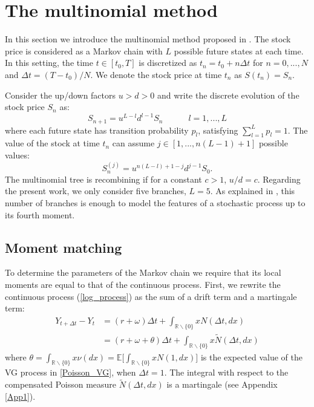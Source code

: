 \documentclass[]{interact}
\newcommand{\numberset}{\mathbb}
\newcommand{\R}{\numberset{R}}
\newcommand{\E}{\numberset{E}}
\theoremstyle{plain}%
\theoremstyle{definition}
\theoremstyle{remark}
\begin{document}
\section{The multinomial method} \label{sec3}
In this section we introduce the multinomial method proposed in \cite{YaPr06}. 
The stock price is considered as a Markov chain with $L$ possible future states at each time. 
In this setting, the time $t \in [t_0,T]$ is discretized as $t_n = t_0 + n\Delta t$ for $n=0, ... ,N$ and 
$\Delta t = (T-t_0)/N$. We denote the stock price at time $t_n$ as $S(t_n) = S_n$.

Consider the up/down factors $u>d>0$ and write the discrete evolution of the stock price $S_n$ as:
\begin{equation}\label{Discr_S}
  S_{n+1} = u^{L-l}d^{l-1} S_n  \hspace{3em} l=1, ... , L  
\end{equation}
where each future state has transition probability $p_l$, satisfying $\sum_{l=1}^L p_l = 1$.
The value of the stock at time $t_n$ can assume $j \in [1,...,n(L-1)+1]$ possible values:
\begin{equation}\label{Discr_S2}
  S_{n}^{(j)} = u^{n(L-l)+1-j}d^{j-1} S_0.  
\end{equation}
The multinomial tree is recombining if for a constant $c>1$, $u/d = c$.
Regarding the present work, we only consider five branches, $L=5$. As explained in \cite{YaPr06}, this number of branches is 
enough to model the features of a stochastic process up to its fourth moment.


\subsection{Moment matching}

To determine the parameters of the Markov chain we require that its local moments are equal to that of the continuous process.
First, we rewrite the continuous process (\ref{log_process}) as the sum of a drift term and a martingale term:
\begin{align}\label{log_martingale}
 Y_{t+\Delta t}-Y_t &= (r+\omega)\Delta t + \int_{\R \backslash \{0\}} x N(\Delta t,dx) \\ \nonumber
		    &= (r+\omega + \theta)\Delta t + \int_{\R \backslash \{0\}} x \tilde N(\Delta t,dx)
\end{align}
where $\theta = \int_{\R \backslash \{0\}} x \nu(dx) = \E \bigl[ \int_{\R \backslash \{0\}} x N(1,dx) \bigr]$ is the expected value of the VG process in \ref{Poisson_VG}, 
when $\Delta t=1$. 
The integral with respect to the compensated Poisson measure $\tilde N(\Delta t,dx)$ is a martingale (see Appendix \ref{App1}).
\end{document}
